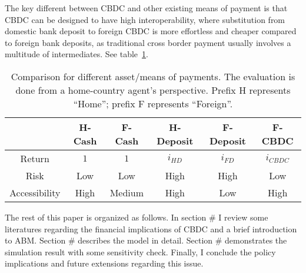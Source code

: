 The key different between CBDC and other existing means of payment is that CBDC
can be designed to have high interoperability, where substitution from domestic
bank deposit to foreign CBDC is more effortless and cheaper compared to foreign
bank deposits, as traditional cross border payment usually involves a multitude
of intermediates. See table~\ref{table: compare-mop}.

\begin{table}[t]
    \centering
    \begin{tabular}{c c c c c c}
        &H-Cash&F-Cash&H-Deposit&F-Deposit& F-CBDC \\
        \hline
        Return & $1$ & $1$ & $i_{HD}$ & $i_{FD}$ & $i_{CBDC}$ \\
        Risk & Low & Low & High & High & Low \\
        Accessibility & High & Medium & High & Low & High \\
        \hline
    \end{tabular}
    \caption{Comparison for different asset/means of payments. The evaluation is
    done from a home-country agent's perspective. Prefix H represents ``Home'';
    prefix F represents ``Foreign''.}
    \label{table: compare-mop}
\end{table}

The rest of this paper is organized as follows. In section \# I review some
literatures regarding the financial implications of CBDC and a brief
introduction to ABM. Section \# describes the model in detail. Section \#
demonstrates the simulation result with some sensitivity check. Finally, I
conclude the policy implications and future extensions regarding this issue.